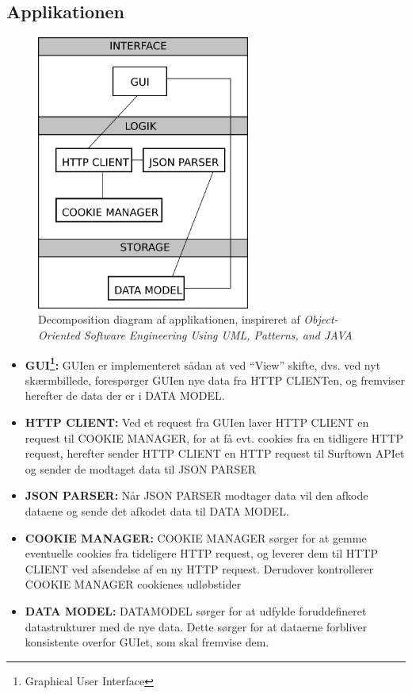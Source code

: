 \documentclass[12pt]{article}
\begin{document}
\subsection*{Applikationen}
\begin{figure}[h]
	\centering
	\includegraphics[width=7cm]{system_components.png}
	\caption{Decomposition diagram af applikationen, inspireret af \emph{Object-Oriented Software Engineering Using UML, Patterns, and JAVA}\cite{OOSE}}
	\label{system_components}
\end{figure}
\begin{itemize}
	\item{\textbf{GUI\footnote{Graphical User Interface}: } GUIen er implementeret sådan at ved ``View'' skifte, dvs. ved nyt skærmbillede, forespørger GUIen nye data fra  HTTP CLIENTen, og fremviser herefter de data der er i DATA MODEL.}	
	\item{\textbf{HTTP CLIENT: } Ved et request fra GUIen laver HTTP CLIENT en request til COOKIE MANAGER, for at få evt. cookies fra en tidligere HTTP request, herefter sender HTTP CLIENT en HTTP request til Surftown APIet og sender de modtaget data til JSON PARSER}	
	\item{\textbf{JSON PARSER: }Når JSON PARSER modtager data vil den afkode dataene og sende det afkodet data til DATA MODEL.}
	\item{\textbf{COOKIE MANAGER: }COOKIE MANAGER sørger for at gemme eventuelle cookies fra tideligere HTTP request, og leverer dem til HTTP CLIENT ved afsendelse af en ny HTTP request. Derudover kontrollerer COOKIE MANAGER cookienes udløbstider}
	\item{\textbf{DATA MODEL: }DATAMODEL sørger for at udfylde foruddefineret datastrukturer med de nye data. Dette sørger for at dataerne forbliver konsistente overfor GUIet, som skal fremvise dem.}
\end{itemize}
\end{document}
